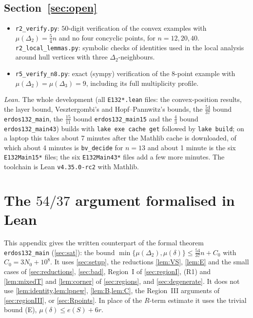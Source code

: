 \documentclass[11pt]{amsart}
\theoremstyle{definition}
\theoremstyle{remark}
\newcommand{\Dt}{\Delta_2}
\newcommand{\mult}{\mu}
\begin{document}
\subsection*{\texorpdfstring{Section~\ref{sec:open}}{Open problems}}
\begin{itemize}[leftmargin=2em]
\item \texttt{r2\_verify.py}: $50$-digit verification of the convex examples with $\mult(\Dt)=\frac54n$ and no four concyclic points, for $n=12,20,40$. \texttt{r2\_local\_lemmas.py}: symbolic checks of identities used in the local analysis around hull vertices with three $\Dt$-neighbours.
\item \texttt{r5\_verify\_n8.py}: exact (sympy) verification of the $8$-point example with $\mult(\Dt)=\mult(\Delta_3)=9$, including its full multiplicity profile.
\end{itemize}

\emph{Lean.} The whole development (all \texttt{E132*.lean} files: the convex-position results, the layer bound, Vesztergombi's and Hopf--Pannwitz's bounds, the $\frac{54}{37}$ bound \texttt{erdos132\_main}, the $\frac{15}{11}$ bound \texttt{erdos132\_main15} and the $\frac43$ bound \texttt{erdos132\_main43}) builds with \texttt{lake exe cache get} followed by \texttt{lake build}; on a laptop this takes about 7 minutes after the Mathlib cache is downloaded, of which about 4 minutes is \texttt{bv\_decide} for $n=13$ and about 1 minute is the six \texttt{E132Main15*} files; the six \texttt{E132Main43*} files add a few more minutes. The toolchain is Lean \texttt{v4.35.0-rc2} with Mathlib.

\section{The \texorpdfstring{$54/37$}{54/37} argument formalised in Lean}\label{app:lean54}

This appendix gives the written counterpart of the formal theorem \texttt{erdos132\_main} (\cref{sec:sat}): the bound $\min\{\mult(\Dt),\mult(\delta)\}\le\frac{54}{37}n+C_0$ with $C_0=3N_0+10^8$. It uses \cref{sec:setup}, the reductions \cref{lem:VS}, \cref{lem:E} and the small cases of \cref{sec:reductions}, \cref{sec:bad}, Region~I of \cref{sec:regionI}, (R1) and \cref{lem:mixedT} and \cref{lem:corner} of \cref{sec:regions}, and \cref{sec:degenerate}. It does not use \cref{lem:identity,lem:lpnew}, \cref{lem:B,lem:C}, the Region~III arguments of \cref{sec:regionIII}, or \cref{sec:Rpoints}. In place of the $R$-term estimate it uses the trivial bound (E), $\mult(\delta)\le e(S)+6r$.
\end{document}

